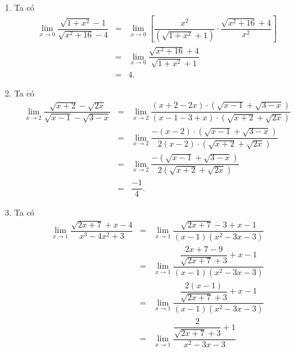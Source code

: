 \begin{ex}
{\begin{enumerate}
\begin{eqnarray*}
				&=& \displaystyle\lim_{x \to 1} \left[\dfrac{(2x+7-9)}{\left(2- \sqrt{x+3}\right)\cdot\left(\sqrt{2x+7}+3\right)} \cdot \dfrac{\left(2+\sqrt{x+3}\right)}{\left(2+\sqrt{x+3}\right)}\right]  \\
				&=& \displaystyle\lim_{x \to  1} \dfrac{2(x-1)\left(2+\sqrt{x+ 3}\right)}{(x-1)\left(\sqrt{2x+7}+3\right)} \\
				&=& \displaystyle\lim_{x \to  1} \dfrac{2\left(2+ \sqrt{x+3}\right)}{\sqrt{2x+7}+3} \\
				 &=& \dfrac{8}{5}.
			\end{eqnarray*}
			\item Ta có 
			\begin{eqnarray*}
				 \displaystyle\lim_{x \to 0} \dfrac{\sqrt{1+x^2}-1}{\sqrt{x^2+16}-4}
				&=& \displaystyle\lim_{x \to 0} \left[\dfrac{x^2}{\left(\sqrt{1+x^2} +  1\right)} \cdot \dfrac{\sqrt{x^2+16}+4}{x^2}\right]\\
				&=& \displaystyle\lim_{x  \to 0} \dfrac{\sqrt{x^2+16}+4}{\sqrt{1+x^2} + 1} \\
				&=& 4. 
			\end{eqnarray*}
			\item Ta có 
			\begin{eqnarray*}
				\displaystyle\lim_{x \to  2} \dfrac{\sqrt{x+2}-\sqrt{2x}}{\sqrt{x-1}- \sqrt{3-x}}
				&=& \displaystyle\lim_{x  \to 2} \dfrac{(x+2-2x)\cdot\left(\sqrt{x-1} +\sqrt{3-x}\right)}{(x-1-3+x)\cdot\left(\sqrt{x + 2} + \sqrt{2x}\right)} \\
				 &=& \displaystyle\lim_{x \to 2} \dfrac{-(x-2)\cdot\left(\sqrt{x-1} +\sqrt{3-x}\right)}{2(x-2)\cdot\left(\sqrt{x+2}+\sqrt{2x}\right)} \\
				 &=& \displaystyle\lim_{x \to 2} \dfrac{-\left(\sqrt{x-1} +\sqrt{3-x}\right)}{2\left(\sqrt{x+2}+ \sqrt{2x}\right)} \\
				 &=&\dfrac{-1}{4}.
			\end{eqnarray*}
			\item Ta  có
			\begin{eqnarray*}
				\displaystyle\lim_{x \to  1} \dfrac{\sqrt{2x+7}+x-4}{x^3-4x^2+3}
				&=& \displaystyle\lim_{x \to 1} \dfrac{\sqrt{2x+7}-3+x-1}{(x-1)(x^2-3x-3)}  \\
				&=& \displaystyle\lim_{x  \to 1} \dfrac{\dfrac{2x+7-9}{\sqrt{2x+7}+3}+x-1}{(x-1)(x^2-3x-3)} \\
				&=& \displaystyle\lim_{x \to 1} \dfrac{\dfrac{2(x-1)}{\sqrt{2x+7}+3}+x-1}{(x-1)(x^2-3x-3)}  \\
				&=&  \displaystyle\lim_{x \to 1} \dfrac{\dfrac{2}{\sqrt{2x+7}+3}+1}{x^2-3x-3} \\

\end{eqnarray*}
\end{enumerate}}
\end{ex}
